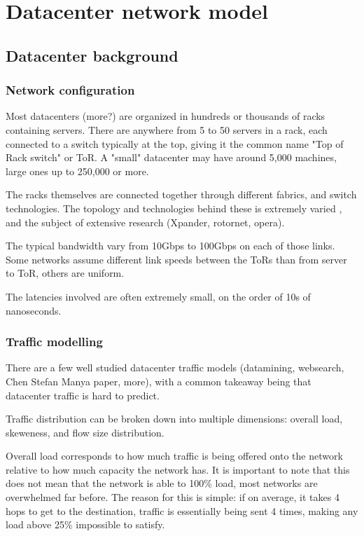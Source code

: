 \chapter{Datacenter network model} \label{model}

\section{Datacenter background} \label{model-dc}
\subsection{Network configuration} \label{model-network}

Most datacenters \cite{mellette_rotornet_2017}\cite{handley_re-architecting_2017}\cite{mellette_expanding_2019} (more?) are organized in hundreds or thousands of racks containing servers.
There are anywhere from 5 to 50 servers in a rack, each connected to a switch typically at the top, giving it the common name "Top of Rack switch" or ToR.
A "small" datacenter may have around 5,000 machines, large ones up to 250,000 or more. %

The racks themselves are connected together through different fabrics, and switch technologies.
The topology and technologies behind these is extremely varied \cite{kassing_beyond_2017}, and the subject of extensive research (Xpander, rotornet, opera). %

The typical bandwidth vary from 10Gbps to 100Gbps on each of those links.
Some networks assume different link speeds between the ToRs than from server to ToR, others are uniform.

The latencies involved are often extremely small, on the order of 10s of nanoseconds.


\subsection{Traffic modelling} \label{model-traffic}

There are a few well studied datacenter traffic models (datamining, websearch, Chen Stefan Manya paper, more), with a common takeaway being that datacenter traffic is hard to predict.

Traffic distribution can be broken down into multiple dimensions: overall load, skeweness, and flow size distribution.

Overall load corresponds to how much traffic is being offered onto the network relative to how much capacity the network has.
It is important to note that this does not mean that the network is able to 100\% load, most networks are overwhelmed far before.
The reason for this is simple: if on average, it takes 4 hops to get to the destination, traffic is essentially being sent 4 times, making any load above 25\% impossible to satisfy.


